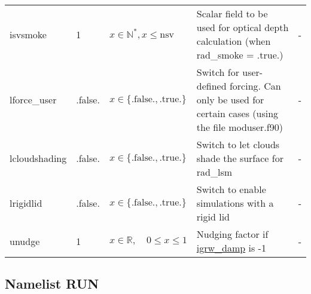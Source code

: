 \documentclass[twoside,11pt,fleqn,a4paper,english,openright]{report}
\begin{document}
\begin{center}
\begin{supertabular}{|l|p{1.6cm}|p{4cm}|p{6cm}|l|}
  isvsmoke	& 1		& $x \in \mathbb{N}^*, x \leq \text{nsv}$	& Scalar field to be used for optical depth calculation (when rad\_smoke = .true.)	& -\\
  lforce\_user	& .false. & $x\in\{\text{.false.},\text{.true.}\}$ & Switch for user-defined forcing. Can only be used for certain cases (using the file moduser.f90) & -\\
  lcloudshading	& .false. & $x\in\{\text{.false.},\text{.true.}\}$ & Switch to let clouds shade the surface for rad\_lsm & -\\
  lrigidlid	& .false. & $x\in\{\text{.false.},\text{.true.}\}$ & Switch to enable simulations with a rigid lid & -\\
  unudge	& 1		& $x \in \mathbb{R}, \quad 0 \leq x \leq 1$	& Nudging factor if \hyperlink{igrw}{igrw\_damp} is -1 & -\\
\end{supertabular}
\end{center}

\subsection{Namelist RUN}\label{par:run}
\end{document}
